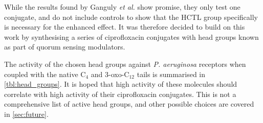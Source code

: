 While the results found by Ganguly \textit{et al.} show promise, they only test one conjugate, and do not include controls to show that the HCTL group specifically is necessary for the enhanced effect.
It was therefore decided to build on this work by synthesising a series of ciprofloxacin conjugates with head groups known as part of quorum sensing modulators\cite{Galloway2011,Hodgkinson2012a}.

The activity of the chosen head groups against \textit{P. aeruginosa} receptors when coupled with the native C$_4$ and 3-oxo-C$_{12}$ tails is summarised in \ref{tbl:head_groups}. It is hoped that high activity of these molecules should correlate with high activity of their ciprofloxacin conjugates.
This is not a comprehensive list of active head groups, and other possible choices are covered in \ref{sec:future}.

